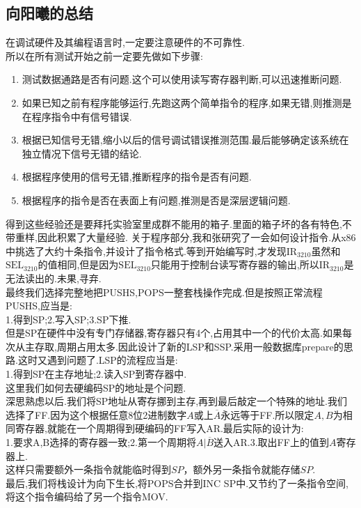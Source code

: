 \documentclass[UTF8]{ctexart}
\begin{document}
\subsection{向阳曦的总结}
在调试硬件及其编程语言时,一定要注意硬件的不可靠性.\\
\indent 所以在所有测试开始之前一定要先做如下步骤:
\begin{enumerate}
	\item 测试数据通路是否有问题.这个可以使用读写寄存器判断,可以迅速推断问题.
	\item 如果已知之前有程序能够运行,先跑这两个简单指令的程序,如果无错,则推测是在程序指令中有信号错误.
	\item 根据已知信号无错,缩小以后的信号调试错误推测范围.最后能够确定该系统在独立情况下信号无错的结论.
	\item 根据程序使用的信号无错,推断程序的指令是否有问题.
	\item 根据程序的指令是否在表面上有问题,推测是否是深层逻辑问题.
\end{enumerate}
\indent\indent 得到这些经验还是要拜托实验室里成群不能用的箱子.里面的箱子坏的各有特色,不带重样,因此积累了大量经验.
关于程序部分,我和张研究了一会如何设计指令.从x86中挑选了大约十条指令,并设计了指令格式.等到开始编写时,才发现$\text{IR}_{3210}$虽然和$\text{SEL}_{3210}$的值相同,但是因为$\text{SEL}_{3210}$只能用于控制台读写寄存器的输出,所以$\text{IR}_{3210}$是无法读出的.未果,寻弃.\\
\indent 最终我们选择完整地把PUSHS,POPS一整套栈操作完成.但是按照正常流程PUSHS,应当是:\\
\indent \indent 1.得到SP;2.写入SP;3.SP下推.
\\ 但是SP在硬件中没有专门存储器,寄存器只有4个,占用其中一个的代价太高.如果每次从主存取,周期占用太多.因此设计了新的LSP和SSP.采用一般数据库prepare的思路.这时又遇到问题了.LSP的流程应当是:\\
\indent \indent 1.得到SP在主存地址;2.读入SP到寄存器中.\\
\indent 这里我们如何去硬编码SP的地址是个问题.\\
\indent 深思熟虑以后.我们将SP地址从寄存挪到主存,再到最后敲定一个特殊的地址.我们选择了FF.因为这个根据任意8位2进制数字$A$或上$\overline{A}$永远等于FF.所以限定$A,B$为相同寄存器,就能在一个周期得到硬编码的FF写入AR.最后实际的设计为:\\
\indent \indent 1.要求A,B选择的寄存器一致;2.第一个周期将$A|\overline{B}$送入AR.3.取出FF上的值到$A$寄存器上.\\
\indent 这样只需要额外一条指令就能临时得到$SP$，额外另一条指令就能存储$SP$.\\
\indent 最后,我们将栈设计为向下生长,将POPS合并到INC SP中.又节约了一条指令空间,将这个指令编码给了另一个指令MOV.
\end{document}
